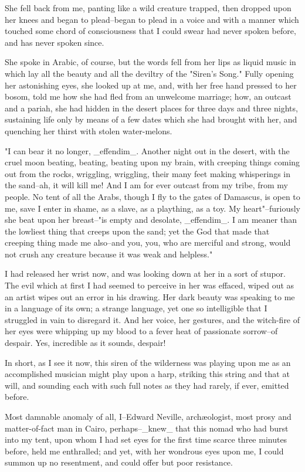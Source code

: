 She fell back from me, panting like a wild creature trapped, then
dropped upon her knees and began to plead--began to plead in a voice
and with a manner which touched some chord of consciousness that I
could swear had never spoken before, and has never spoken since.

She spoke in Arabic, of course, but the words fell from her lips as
liquid music in which lay all the beauty and all the deviltry of the
"Siren's Song." Fully opening her astonishing eyes, she looked up at
me, and, with her free hand pressed to her bosom, told me how she had
fled from an unwelcome marriage; how, an outcast and a pariah, she
had hidden in the desert places for three days and three nights,
sustaining life only by means of a few dates which she had brought
with her, and quenching her thirst with stolen water-melons.

"I can bear it no longer, _effendim_. Another night out in the desert,
with the cruel moon beating, beating, beating upon my brain, with
creeping things coming out from the rocks, wriggling, wriggling, their
many feet making whisperings in the sand--ah, it will kill me! And I
am for ever outcast from my tribe, from my people. No tent of all the
Arabs, though I fly to the gates of Damascus, is open to me, save I
enter in shame, as a slave, as a plaything, as a toy. My
heart"--furiously she beat upon her breast--"is empty and desolate,
_effendim_. I am meaner than the lowliest thing that creeps upon the
sand; yet the God that made that creeping thing made me also--and you,
you, who are merciful and strong, would not crush any creature because
it was weak and helpless."

I had released her wrist now, and was looking down at her in a sort
of stupor. The evil which at first I had seemed to perceive in her was
effaced, wiped out as an artist wipes out an error in his drawing. Her
dark beauty was speaking to me in a language of its own; a strange
language, yet one so intelligible that I struggled in vain to
disregard it. And her voice, her gestures, and the witch-fire of her
eyes were whipping up my blood to a fever heat of passionate
sorrow--of despair. Yes, incredible as it sounds, despair!

In short, as I see it now, this siren of the wilderness was playing
upon me as an accomplished musician might play upon a harp, striking
this string and that at will, and sounding each with such full notes
as they had rarely, if ever, emitted before.

Most damnable anomaly of all, I--Edward Neville, archæologist, most
prosy and matter-of-fact man in Cairo, perhaps--_knew_ that this nomad
who had burst into my tent, upon whom I had set eyes for the first
time scarce three minutes before, held me enthralled; and yet, with
her wondrous eyes upon me, I could summon up no resentment, and could
offer but poor resistance.

